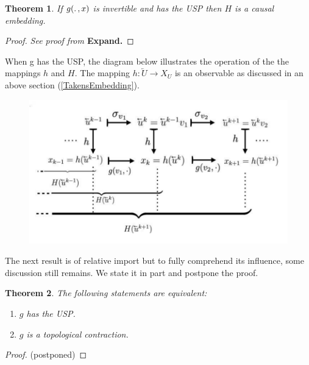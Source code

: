 \documentclass[a4paper,12pt,twoside]{book}
\newtheorem{Theorem}{Theorem}[]
\begin{document}
\begin{Theorem}
 If $g(\ldotp,x)$ is invertible and has the USP then $H$ is a causal embedding. 
\end{Theorem}
\begin{proof}
  \emph{See proof from \cite{manjunath2021universal}}  \textbf{Expand.}
\end{proof}

When g has the USP, the diagram below illustrates the operation of the the mappings $h$ and $H$. The mapping $h:\overleftarrow{U}\to{X_U}$ is an observable as discussed in an above section (\ref{TakensEmbedding}).  

\begin{figure}[ht]
  \includegraphics[scale=0.3]{actionofh_H.png}
  \centering
  \label{fig:actionh_H}
\end{figure}

The next result is of relative import but to fully comprehend its influence, some discussion still remains. We state it in part and postpone the proof.

\begin{Theorem}
  The following statements are equivalent:
  \vspace{-8mm}
  \begin{enumerate}[noitemsep, label=\roman*.]
    \item $g$ has the USP. 
    \item $g$ is a topological contraction.
  \end{enumerate}
\end{Theorem}
\begin{proof}
  (postponed) 
\end{proof}

\end{document}
